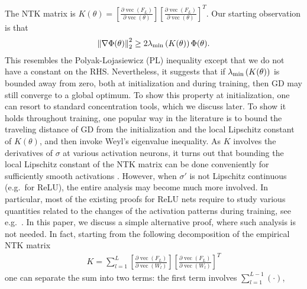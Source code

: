 \documentclass{article}
\def\RR{\mathbb{R}}
\def\vec{\operatorname{\mathop{vec}}}
\newcommand{\norm}[1]{\left\|#1\right\|}
\newcommand{\evmin}[1]{\lambda_{\rm min}\left(#1\right)}
\begin{document}
The NTK matrix is
$K(\theta)=\left[\frac{\partial\vec(F_L)}{\partial\vec(\theta)}\right] \left[\frac{\partial\vec(F_L)}{\partial\vec(\theta)}\right]^T.$
Our starting observation is that
\begin{align*}
    \norm{\nabla\Phi(\theta)}_2^2 \geq 2\evmin{K(\theta)} \Phi(\theta).
\end{align*}
This resembles the Polyak-Lojasiewicz (PL) inequality \cite{Polyak1963} except that we do not have a constant on the RHS.
Nevertheless, it suggests that if $\evmin{K(\theta)}$ is bounded away from zero, both at initialization and during training,
then GD may still converge to a global optimum.
To show this property at initialization, one can resort to standard concentration tools, which we discuss later.
To show it holds throughout training, one popular way in the literature is to bound 
the traveling distance of GD from the initialization and the local Lipschitz constant of $K(\theta)$, and then invoke Weyl's eigenvalue inequality.
As $K$ involves the derivatives of $\sigma$ at various activation neurons,
it turns out that bounding the local Lipschitz constant of the NTK matrix can be done conveniently for sufficiently smooth activations \cite{DuEtal2019}.
However, when $\sigma'$ is not Lipschitz continuous (e.g.\ for ReLU), the entire analysis may become much more involved.
In particular, most of the existing proofs for ReLU nets require to study various quantities related to 
the changes of the activation patterns during training, see e.g.\ \cite{AllenZhuEtal2018, ZouGu2019}.
In this paper, we discuss a simple alternative proof, where such analysis is not needed.
In fact, starting from the following decomposition of the empirical NTK matrix
\begin{align}
    K=\sum_{l=1}^{L} \left[\frac{\partial\vec(F_L)}{\partial\vec(W_l)}\right] \left[\frac{\partial\vec(F_L)}{\partial\vec(W_l)}\right]^T
\end{align}
one can separate the sum into two terms: the first term involves $\sum_{l=1}^{L-1}(\cdot)$, 
\end{document}
